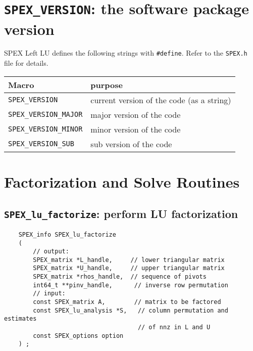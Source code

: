 \documentclass[12pt]{report}
\theoremstyle{definition}
\begin{document}
\cprotect\section{\verb|SPEX_VERSION|: the software package version}

SPEX Left LU defines the following strings with \verb|#define|. Refer to
the \verb|SPEX.h| file for details.

\begin{center}
\begin{tabular}{ll}
\hline
Macro & purpose \\
\hline
\verb|SPEX_VERSION|       & current version of the code (as a string)\\
\verb|SPEX_VERSION_MAJOR| & major version of the code\\
\verb|SPEX_VERSION_MINOR| & minor version of the code   \\
\verb|SPEX_VERSION_SUB|   & sub version of the code\\
\hline
\end{tabular}
\end{center}

\section{Factorization and Solve Routines}

\cprotect\subsection{\verb|SPEX_lu_factorize|: perform LU factorization}
\label{s:LeftLU:SPEX_lu_factorize}

\begin{mdframed}[userdefinedwidth=6in]
{\footnotesize
\begin{verbatim}
    SPEX_info SPEX_lu_factorize
    (
        // output:
        SPEX_matrix *L_handle,     // lower triangular matrix
        SPEX_matrix *U_handle,     // upper triangular matrix
        SPEX_matrix *rhos_handle,  // sequence of pivots
        int64_t **pinv_handle,      // inverse row permutation
        // input:
        const SPEX_matrix A,        // matrix to be factored
        const SPEX_lu_analysis *S,   // column permutation and estimates
                                     // of nnz in L and U
        const SPEX_options option
    ) ;
\end{verbatim}
} \end{mdframed}
\end{document}
